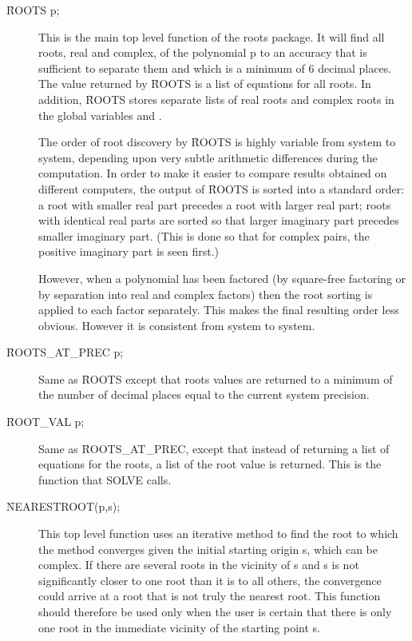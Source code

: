 \begin{description}
\hypertarget{operator:ROOTS}{}
\hypertarget{reserved:ROOTSREAL}{}
\hypertarget{reserved:ROOTSCOMPLEX}{}
\item[\f{ROOTS} p;] This is the main top level function of the roots package.
It will find all roots, real and complex, of the polynomial p to an
accuracy that is sufficient to separate them and which is a minimum of 6
decimal places.  The value returned by \f{ROOTS} is a
list of equations for all roots.  In addition, \f{ROOTS} stores separate lists
of real roots and complex roots in the global variables  and
.  
\par
The order of root discovery by \f{ROOTS} is highly variable from system to
system, depending upon very subtle arithmetic differences during the
computation.  In order to make it easier to compare results obtained on
different computers, the output of \f{ROOTS} is sorted into a standard order:
a root with smaller real part precedes a root with larger real part; roots
with identical real parts are sorted so that larger imaginary part
precedes smaller imaginary part. (This is done so that for complex pairs,
the positive imaginary part is seen first.)

However, when a polynomial has been factored (by square-free factoring or
by separation into real and complex factors) then the root sorting is
applied to each factor separately.  This makes the final resulting order
less obvious.  However it is consistent from system to system.

\hypertarget{operator:ROOTS_AT_PREC}{}
\item[\f{ROOTS\_AT\_PREC} p;] Same as \f{ROOTS} except that roots values are
returned to a minimum of the number of decimal places equal to the current
system precision.

\hypertarget{operator:ROOT_VAL}{}
\item[\f{ROOT\_VAL} p;] Same as \f{ROOTS\_AT\_PREC}, except that instead of
returning a list of equations for the roots, a list of the root value is
returned.  This is the function that SOLVE calls.

\hypertarget{operator:NEARESTROOT}{}
\item[\f{NEARESTROOT}(p,s);] This top level function uses an iterative method
to find the root to which the method converges given the initial starting
origin s, which can be complex.  If there are several roots in the
vicinity of s and s is not significantly closer to one root than it is to
all others, the convergence could arrive at a root that is not truly the
nearest root.  This function should therefore be used only when the user
is certain that there is only one root in the immediate vicinity of the
starting point s.


\end{description}
